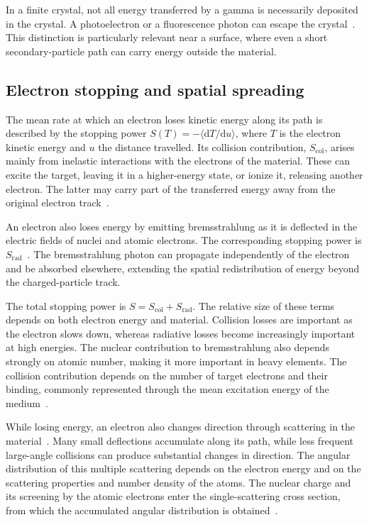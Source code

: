 In a finite crystal, not all energy transferred by a gamma is necessarily deposited in the crystal. A photoelectron or a fluorescence photon can escape the crystal~\parencite{storm2020photoelectronescape, ballabriga2016review}. This distinction is particularly relevant near a surface, where even a short secondary-particle path can carry energy outside the material.

\subsection{Electron stopping and spatial spreading}

The mean rate at which an electron loses kinetic energy along its path is described by the stopping power $S(T)=-\langle\mathrm{d}T/\mathrm{d}u\rangle$, where $T$ is the electron kinetic energy and $u$ the distance travelled. Its collision contribution, $S_{\mathrm{col}}$, arises mainly from inelastic interactions with the electrons of the material. These can excite the target, leaving it in a higher-energy state, or ionize it, releasing another electron. The latter may carry part of the transferred energy away from the original electron track~\parencite[pp. 1--2]{berger1983ranges}.

An electron also loses energy by emitting bremsstrahlung as it is deflected in the electric fields of nuclei and atomic electrons. The corresponding stopping power is $S_{\mathrm{rad}}$~\parencite{berger1983ranges}. The bremsstrahlung photon can propagate independently of the electron and be absorbed elsewhere, extending the spatial redistribution of energy beyond the charged-particle track.

The total stopping power is $S=S_{\mathrm{col}}+S_{\mathrm{rad}}$. The relative size of these terms depends on both electron energy and material. Collision losses are important as the electron slows down, whereas radiative losses become increasingly important at high energies. The nuclear contribution to bremsstrahlung also depends strongly on atomic number, making it more important in heavy elements. The collision contribution depends on the number of target electrons and their binding, commonly represented through the mean excitation energy of the medium~\parencite{berger1983ranges}.

While losing energy, an electron also changes direction through scattering in the material~\parencite[eqs.~(17), (20)]{liang2020transport}.
Many small deflections accumulate along its path, while less frequent large-angle collisions can produce substantial changes in direction. The angular distribution of this multiple scattering depends on the electron energy and on the scattering properties and number density of the atoms. The nuclear charge and its screening by the atomic electrons enter the single-scattering cross section, from which the accumulated angular distribution is obtained~\parencite{lewis1950multiple}.

